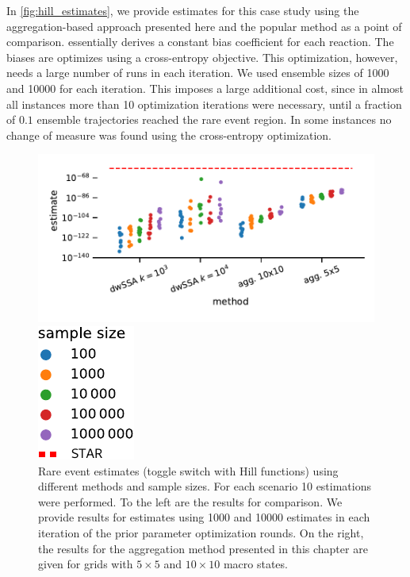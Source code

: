 In \autoref{fig:hill_estimates}, we provide estimates for this case study using the aggregation-based approach presented here and the popular  method as a point of comparison.
 \cite{daigle2011automated} essentially derives a constant bias coefficient for each reaction.
The biases are optimizes using a cross-entropy objective.
This optimization, however, needs a large number of runs in each iteration.
We used ensemble sizes of \num{1000} and \num{10000} for each iteration.
This imposes a large additional cost, since in almost all instances more than \num{10} optimization iterations were necessary, until a fraction of $0.1$ ensemble trajectories reached the rare event region.
In some instances no change of measure was found using the cross-entropy optimization.
\begin{figure}[htb]
    \centering
    \begin{minipage}{0.77\textwidth}
        \includegraphics[scale=.55]{gfx/hill_estimates.pdf}
    \end{minipage}
    \hspace{1ex}
    \begin{minipage}{0.07\textwidth}
        \includegraphics[scale=.55]{gfx/hill_estimates_legend.pdf}
    \end{minipage}
    \caption[Rare event estimates (toggle switch)]{\label{fig:hill_estimates}Rare event estimates (toggle switch with Hill functions) using different methods and sample sizes. For each scenario \num{10} estimations were performed. To the left are the  results for comparison. We provide results for estimates using \num{1000} and \num{10000} estimates in each iteration of the prior parameter optimization rounds. On the right, the results for the aggregation method presented in this chapter are given for grids with $5\times 5$ and $10\times 10$ macro states.}
\end{figure}

